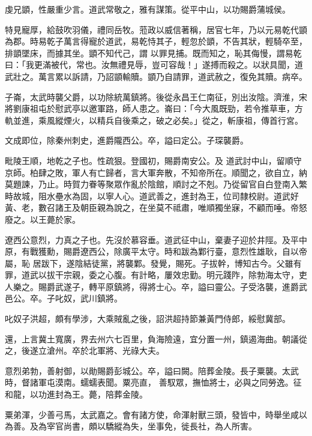 \begin{pinyinscope}
 虔兄顗，性嚴重少言。道武常敬之，雅有謀策。從平中山，以功賜爵蒲城侯。



 特見寵厚，給鼓吹羽儀，禮同岳牧。蒞政以威信著稱，居官七年，乃以元易乾代顗為郡。時易乾子萬言得寵於道武，易乾恃其子，輕忽於顗，不告其狀，輕騎卒至，排顗墜床，而據其坐。顗不知代己，謂
 以罪見捕。既而知之，恥其侮慢，謂易乾曰：「我更滿被代，常也。汝無禮見辱，豈可容哉！」遂搏而殺之。以狀具聞，道武壯之。萬言累以訴請，乃詔顗輸贖。顗乃自請罪，道武赦之，復免其贖。病卒。



 子崙，太武時襲父爵，以功除統萬鎮將。後從永昌王仁南征，別出汝陰。濟淮，宋將劉康祖屯於慰武亭以邀軍路，師人患之。崙曰：「今大風既勁，若令推草車，方軌並進，乘風縱煙火，以精兵自後乘之，破之必矣。」從之，斬康祖，傳首行宮。



 文成即位，除秦州刺史，進爵隴西公。卒，謚曰定公。子琛襲爵。



 毗陵王順，地乾之子也。性疏狠。登國初，賜爵南安公。及
 道武討中山，留順守京師。柏肆之敗，軍人有亡歸者，言大軍奔散，不知帝所在。順聞之，欲自立，納莫題諫，乃止。時賀力眷等聚眾作亂於陰館，順討之不剋。乃從留官自白登南入繁畤故城，阻水壘水為固，以寧人心。道武善之，進封為王，位司隸校尉。道武好黃、老，數召諸王及朝臣親為說之，在坐莫不祗肅，唯順獨坐寐，不顧而唾。帝怒廢之。以王薨於家。



 遼西公意烈，力真之子也。先沒於慕容垂。道武征中山，棄妻子迎於井陘。及平中原，有戰獲勳，賜爵遼西公，除廣平太守。時和跋為鄴行臺，意烈性雄耿，自以帝屬，恥
 居跋下，遂陰結徒黨，將襲鄴。發覺，賜死。子拔幹，博知古今。父雖有罪，道武以拔干宗親，委之心腹。有計略，屢效忠勤。明元踐阼，除勃海太守，吏人樂之。賜爵武遂子，轉平原鎮將，得將士心。卒，謚曰靈公。子受洛襲，進爵武邑公。卒。子叱奴，武川鎮將。



 叱奴子洪超，頗有學涉，大乘賊亂之後，詔洪超持節兼黃門侍郎，綏慰冀部。



 還，上言冀土寬廣，界去州六七百里，負海險遠，宜分置一州，鎮遏海曲。朝議從之，後遂立滄州。卒於北軍將、光祿大夫。



 意烈弟勃，善射御，以勛賜爵彭城公。卒，謚曰闕。陪葬金陵。長子粟襲。太武時，督諸軍屯漠南。蠕蠕表聞。粟亮直，
 善馭眾，撫恤將士，必與之同勞逸。征和龍，以功進封為王。薨，陪葬金陵。



 粟弟渾，少善弓馬，太武嘉之。會有諸方使，命渾射獸三頭，發皆中，時舉坐咸以為善。及為宰官尚書，頗以驕縱為失，坐事免，徙長社，為人所害。




\end{pinyinscope}
